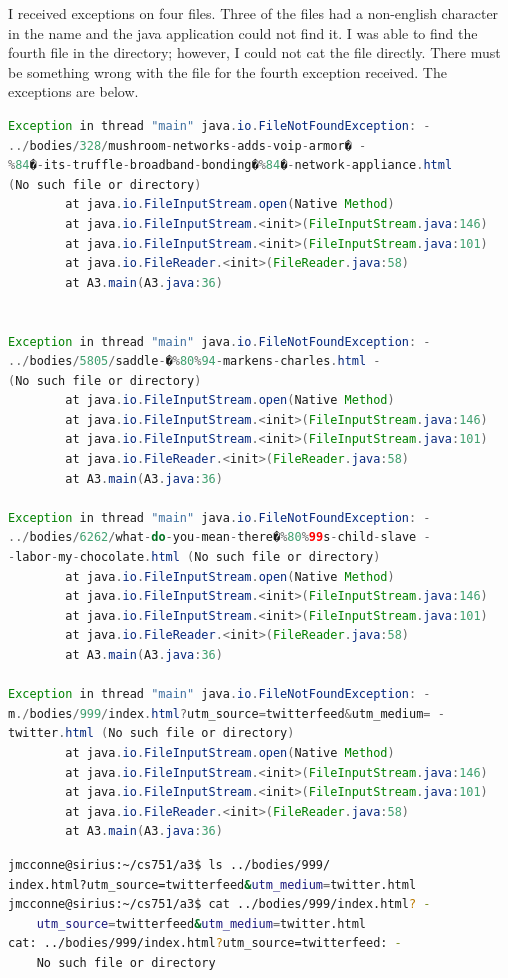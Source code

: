 \documentclass[12pt]{article}
\begin{document}
I received exceptions on four files.  Three of the files had a non-english character in the name and the java application could not find it.  I was able to find the fourth file in the directory; however, I could not cat the file directly.  There must be something wrong with the file for the fourth exception received. The exceptions are below.

\begin{lstlisting}[language=Java]
Exception in thread "main" java.io.FileNotFoundException: -
../bodies/328/mushroom-networks-adds-voip-armor� - 
%84�-its-truffle-broadband-bonding�%84�-network-appliance.html 
(No such file or directory)
        at java.io.FileInputStream.open(Native Method)
        at java.io.FileInputStream.<init>(FileInputStream.java:146)
        at java.io.FileInputStream.<init>(FileInputStream.java:101)
        at java.io.FileReader.<init>(FileReader.java:58)
        at A3.main(A3.java:36)


Exception in thread "main" java.io.FileNotFoundException: -
../bodies/5805/saddle-�%80%94-markens-charles.html -
(No such file or directory)
        at java.io.FileInputStream.open(Native Method)
        at java.io.FileInputStream.<init>(FileInputStream.java:146)
        at java.io.FileInputStream.<init>(FileInputStream.java:101)
        at java.io.FileReader.<init>(FileReader.java:58)
        at A3.main(A3.java:36)

Exception in thread "main" java.io.FileNotFoundException: -
../bodies/6262/what-do-you-mean-there�%80%99s-child-slave -
-labor-my-chocolate.html (No such file or directory)
        at java.io.FileInputStream.open(Native Method)
        at java.io.FileInputStream.<init>(FileInputStream.java:146)
        at java.io.FileInputStream.<init>(FileInputStream.java:101)
        at java.io.FileReader.<init>(FileReader.java:58)
        at A3.main(A3.java:36)

Exception in thread "main" java.io.FileNotFoundException: -
m./bodies/999/index.html?utm_source=twitterfeed&utm_medium= -
twitter.html (No such file or directory)
        at java.io.FileInputStream.open(Native Method)
        at java.io.FileInputStream.<init>(FileInputStream.java:146)
        at java.io.FileInputStream.<init>(FileInputStream.java:101)
        at java.io.FileReader.<init>(FileReader.java:58)
        at A3.main(A3.java:36)
\end{lstlisting}

\begin{lstlisting}[language=bash]
jmcconne@sirius:~/cs751/a3$ ls ../bodies/999/
index.html?utm_source=twitterfeed&utm_medium=twitter.html
jmcconne@sirius:~/cs751/a3$ cat ../bodies/999/index.html? -
    utm_source=twitterfeed&utm_medium=twitter.html
cat: ../bodies/999/index.html?utm_source=twitterfeed: -
    No such file or directory
\end{lstlisting}
\end{document}
